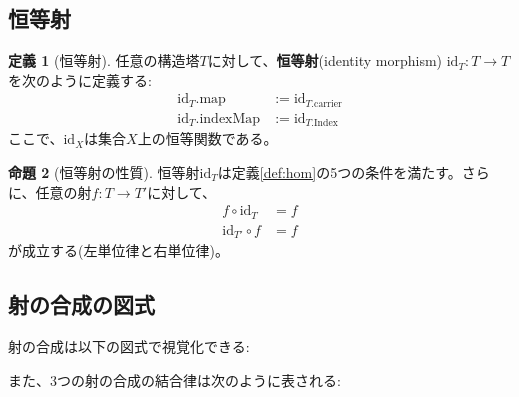 \documentclass[a4paper,12pt]{article}
\theoremstyle{definition}
\newtheorem{definition}{定義}[section]
\newtheorem{proposition}[definition]{命題}
\begin{document}
\subsection{恒等射}

\begin{definition}[恒等射]\label{def:id}
任意の構造塔$T$に対して、\textbf{恒等射}(identity morphism) $\text{id}_T : T \to T$を次のように定義する:
\begin{align*}
\text{id}_T.\text{map} &:= \text{id}_{T.\text{carrier}} \\
\text{id}_T.\text{indexMap} &:= \text{id}_{T.\text{Index}}
\end{align*}
ここで、$\text{id}_X$は集合$X$上の恒等関数である。
\end{definition}

\begin{proposition}[恒等射の性質]
恒等射$\text{id}_T$は定義\ref{def:hom}の5つの条件を満たす。さらに、任意の射$f : T \to T'$に対して、
\begin{align*}
f \circ \text{id}_T &= f \\
\text{id}_{T'} \circ f &= f
\end{align*}
が成立する(左単位律と右単位律)。
\end{proposition}

\subsection{射の合成の図式}

射の合成は以下の図式で視覚化できる:

\begin{center}
\end{center}

また、3つの射の合成の結合律は次のように表される:

\begin{center}
\end{center}
\end{document}
